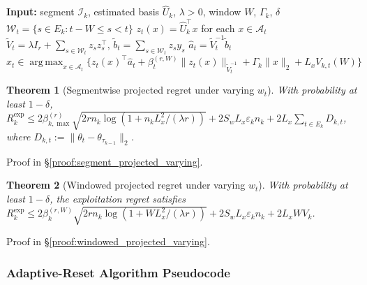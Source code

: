 \documentclass{article}
\newcommand{\cA}{\mathcal{A}}
\newcommand{\cI}{\mathcal{I}}
\DeclareMathOperator*{\argmax}{arg\,max}
\newtheorem{theorem}{Theorem}
\begin{document}
\begin{algorithm}[!htpb]
\caption{Windowed projected ridge-UCB in the learned subspace}
\label{alg:windowed_projected_ofu}
\begin{algorithmic}[1]
\State \textbf{Input:} segment $\cI_k$, estimated basis $\widehat U_k$, $\lambda>0$, window $W$, $\Gamma_k$, $\delta$
    \State $\mathcal W_t = \{s\in E_k : t-W \le s < t\}$
    \State $z_t(x)=\widehat U_k^\top x$ for each $x \in \cA_t$
    \State $\widetilde V_t = \lambda I_r + \sum_{s\in \mathcal W_t} z_s z_s^\top$, \; $\widetilde b_t = \sum_{s\in \mathcal W_t} z_s y_s$
    \State $\widehat a_t = \widetilde V_t^{-1}\widetilde b_t$
    \State $x_t \in \argmax_{x\in \cA_t}\{z_t(x)^\top \widehat a_t + \beta_t^{(r,W)}\|z_t(x)\|_{\widetilde V_t^{-1}} + \Gamma_k\|x\|_2 + L_xV_{k,t}(W)\}$
\EndFor
\end{algorithmic}
\end{algorithm}

\begin{theorem}[Segmentwise projected regret under varying $w_t$]
\label{thm:segment_projected_varying}
With probability at least $1-\delta$,
$R_k^{\mathrm{exp}} \le 2\beta_{k,\max}^{(r)} \sqrt{2rn_k\log(1+n_kL_x^2/(\lambda r))} + 2S_wL_x\varepsilon_k n_k + 2L_x \sum_{t\in E_k} D_{k,t}$,
where $D_{k,t} := \|\theta_t - \theta_{\tau_{k-1}}\|_2$.
\end{theorem}

Proof in \S\ref{proof:segment_projected_varying}.

\begin{theorem}[Windowed projected regret under varying $w_t$]
\label{thm:windowed_projected_varying}
With probability at least $1-\delta$, the exploitation regret satisfies
$R_k^{\mathrm{exp}} \le 2\beta_k^{(r,W)} \sqrt{2rn_k\log(1+WL_x^2/(\lambda r))} + 2S_wL_x\varepsilon_k n_k + 2L_x W V_k$.
\end{theorem}

Proof in \S\ref{proof:windowed_projected_varying}.

\subsubsection{Adaptive-Reset Algorithm Pseudocode}
\label{app:adaptive_pseudocode}
\end{document}
